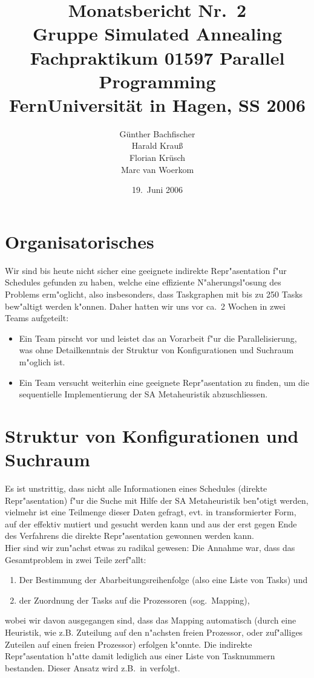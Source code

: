 \documentclass[12pt,a4paper]{article}
\author{G\"unther Bachfischer \\
        Harald Krau\ss{} \\
	Florian Kr\"usch \\
	Marc van Woerkom}
\title{\textbf{Monatsbericht Nr.\ 2}\\
       {\normalsize Gruppe Simulated Annealing} \\
       {\small Fachpraktikum 01597 Parallel Programming} \\
       {\small FernUniversit\"at in Hagen, SS 2006}}
\date{19.\ Juni 2006}
\begin{document}
\maketitle

\section{Organisatorisches}
Wir sind bis heute nicht sicher eine geeignete indirekte Repr"asentation
f"ur Schedules gefunden zu haben, welche eine effiziente N"aherungsl"osung
des Problems erm"oglicht, also insbesonders, dass Taskgraphen mit bis zu 
250 Tasks bew"altigt werden k"onnen.
Daher hatten wir uns vor ca.\ 2 Wochen in zwei Teams aufgeteilt: 
\begin{itemize}
\item Ein Team pirscht vor und leistet das an Vorarbeit
      f"ur die Parallelisierung, was ohne Detailkenntnis
      der Struktur von Konfigurationen und Suchraum m"oglich
      ist.
\item Ein Team versucht weiterhin eine geeignete Repr"asentation zu finden,
      um die sequentielle Implementierung der SA Metaheuristik 
      abzuschliessen. 
\end{itemize}

\section{Struktur von Konfigurationen und Suchraum}
Es ist unstrittig, dass nicht alle Informationen eines Schedules
(direkte Repr"asentation) f"ur die Suche mit Hilfe der SA Metaheuristik
ben"otigt werden, vielmehr ist eine Teilmenge dieser Daten gefragt,
evt. in transformierter Form, auf der effektiv mutiert und
gesucht werden kann und aus der erst gegen Ende des Verfahrens
die direkte Repr"asentation gewonnen werden kann.\\

\noindent
Hier sind wir zun"achst etwas zu radikal gewesen: Die Annahme war,
dass das Gesamtproblem in zwei Teile zerf"allt:
\begin{enumerate}
\item Der Bestimmung der Abarbeitungsreihenfolge (also eine 
      Liste von Tasks) und
\item der Zuordnung der Tasks auf die Prozessoren (sog.\ Mapping),
\end{enumerate}
wobei wir davon ausgegangen sind, dass das Mapping automatisch (durch
eine Heuristik, wie z.B. Zuteilung auf den n"achsten freien Prozessor, oder
zuf"alliges Zuteilen auf einen freien Prozessor) erfolgen k"onnte.
Die indirekte Repr"asentation h"atte damit lediglich aus einer
Liste von Tasknummern bestanden. 
Dieser Ansatz wird z.B.\ in \cite{DavidovicHansenMladenovic2001}
verfolgt. \\
\end{document}
